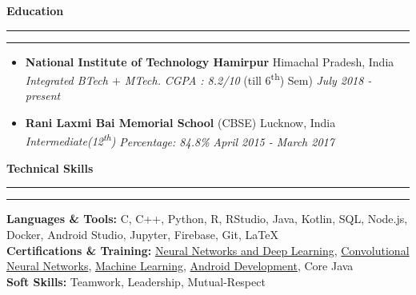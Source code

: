 \documentclass[11pt]{article}
\begin{document}
    \vspace{2pt}
    \textbf{\large{Education}}
    	\vspace{5pt}
    	\hrule \hrule
    	\vspace{-4pt}
    	\begin{itemize}
    		\setlength{\itemsep}{4pt}
        	\setlength{\parskip}{0pt}
        	\setlength{\parsep}{4pt}
        	\item \textbf{National Institute of Technology Hamirpur} \hfill Himachal Pradesh, India\\
        	\textsl{Integrated BTech $+$ MTech.} \textit{CGPA : 8.2/10}  (till 6\textsuperscript{th}) Sem)
        	\hfill 
        	\textit{July 2018 - present}
        	\item \textbf{Rani Laxmi Bai Memorial School} (CBSE) \hfill Lucknow, India\\
        	\textsl{Intermediate(12\textsuperscript{th}) } \textit{Percentage: 84.8\%}  \hfill 
        	\textit{April 2015 - March 2017}
    	\end{itemize}
    \vspace{2pt}
    \textbf{Technical Skills}
    	\vspace{5pt}
    	\hrule \hrule
    	\vspace{4pt}
    	\textbf{Languages \& Tools:} C, C++, Python, R, RStudio, Java, Kotlin, SQL, Node.js, Docker, Android Studio, Jupyter, Firebase, Git, \LaTeX\\
        \textbf{Certifications \& Training:} \href{https://drive.google.com/file/d/1mir_TBy9GinXpSU3H-8LyYn68GkcM62f/view?usp=sharing}{Neural Networks and Deep Learning}, \href{https://drive.google.com/file/d/18cQMPfNLtvY4-Ozh7hZnUIDKYh9tRYPG/view?usp=sharing}{Convolutional Neural Networks}, \href{https://drive.google.com/file/d/13L4JKQ1pwLG9YVevPVZLNRLUeZWGkvyU/view?usp=sharing}{Machine Learning}, \href{https://drive.google.com/file/d/1Hp5dvhNVz9FvjQ6Y4vIVZldKpb8m8LCp/view?usp=sharing}{Android Development}, Core Java\\
        \textbf{Soft Skills:} Teamwork, Leadership, Mutual-Respect\\
   
\end{document}
